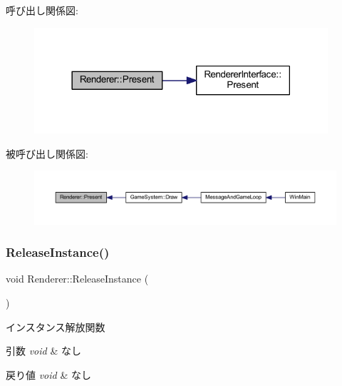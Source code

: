 呼び出し関係図\+:\nopagebreak
\begin{figure}[H]
\begin{center}
\leavevmode
\includegraphics[width=309pt]{class_renderer_a1dac4baae1fa79166442b0778a9c8728_cgraph}
\end{center}
\end{figure}
被呼び出し関係図\+:\nopagebreak
\begin{figure}[H]
\begin{center}
\leavevmode
\includegraphics[width=350pt]{class_renderer_a1dac4baae1fa79166442b0778a9c8728_icgraph}
\end{center}
\end{figure}
\mbox{\label{class_renderer_aa7ac523172faaf376ecddaed4bdc0781}} 
\subsubsection{\texorpdfstring{Release\+Instance()}{ReleaseInstance()}}
{\footnotesize\ttfamily void Renderer\+::\+Release\+Instance (\begin{DoxyParamCaption}{ }\end{DoxyParamCaption})\hspace{0.3cm}{\ttfamily [static]}}



インスタンス解放関数 


\begin{DoxyParams}{引数}
{\em void} & なし \\
\hline
\end{DoxyParams}

\begin{DoxyRetVals}{戻り値}
{\em void} & なし \\
\hline
\end{DoxyRetVals}


